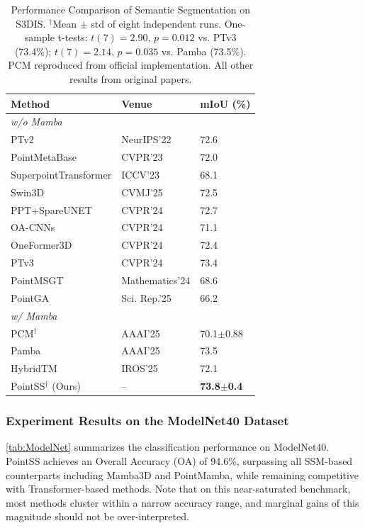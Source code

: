 \documentclass[a4paper,fleqn]{cas-sc}
\begin{document}
\begin{table}
	\centering
	\caption{Performance Comparison of Semantic Segmentation on S3DIS. $^\dagger$Mean $\pm$ std of eight independent runs. One-sample t-tests: $t(7)=2.90$, $p=0.012$ vs. PTv3 (73.4\%); $t(7)=2.14$, $p=0.035$ vs. Pamba (73.5\%). PCM reproduced from official implementation. All other results from original papers.}
	\label{tab:s3dis}
	\begin{tabular}{@{}lll@{}}
		\toprule
		\textbf{Method} & \textbf{Venue} & \textbf{mIoU (\%)} \\ \midrule
		\multicolumn{3}{l}{\textit{w/o Mamba}} \\
		PTv2 \cite{ptv2} & NeurIPS'22 & 72.6 \\
		PointMetaBase\cite{pmb} & CVPR'23 & 72.0 \\
		SuperpointTransformer\cite{spt} & ICCV'23 & 68.1 \\
		Swin3D\cite{Swin3D} & CVMJ'25 & 72.5 \\
		PPT+SpareUNET\cite{ppt} & CVPR'24 & 72.7 \\
		OA-CNNs\cite{oacnn} & CVPR'24 & 71.1 \\
		OneFormer3D\cite{OneFormer3D} & CVPR'24 & 72.4 \\
		PTv3\cite{ptv3} & CVPR'24 & 73.4 \\
		PointMSGT\cite{pointmsgt} & Mathematics'24 & 68.6 \\
		PointGA\cite{pointga} & Sci. Rep.'25 & 66.2 \\ \midrule
		\multicolumn{3}{l}{\textit{w/ Mamba}} \\
		PCM$^\dagger$\cite{pcm} & AAAI'25 & 70.1$\pm$0.88 \\
		Pamba\cite{pamba} & AAAI'25 & 73.5 \\
		HybridTM\cite{hybridtm} & IROS'25 & 72.1 \\
		PointSS$^\dagger$ (Ours) & -- & \textbf{73.8$\pm$0.4} \\ \bottomrule
	\end{tabular}
\end{table}

\subsubsection{Experiment Results on the ModelNet40 Dataset}

\cref{tab:ModelNet} summarizes the classification performance on ModelNet40. PointSS achieves an Overall Accuracy (OA) of 94.6\%, surpassing all SSM-based counterparts including Mamba3D and PointMamba, while remaining competitive with Transformer-based methods. Note that on this near-saturated benchmark, most methods cluster within a narrow accuracy range, and marginal gains of this magnitude should not be over-interpreted.
\end{document}
